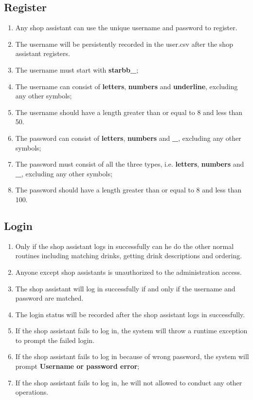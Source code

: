 \documentclass[a4paper]{report}
\begin{document}
\subsection{Register}
\begin{enumerate}
\item Any shop assistant can use the unique username and password to register.
\item The username will be persistently recorded in the user.csv after the shop assistant registers.
\item The username must start with \textbf{starbb\_};
\item The username can consist of \textbf{letters}, \textbf{numbers} and \textbf{underline}, excluding any other symbols;
\item The username should have a length greater than or equal to 8 and less than 50.
\item The password can consist of \textbf{letters}, \textbf{numbers} and \textbf{\_}, excluding any other symbols;
\item The password must consist of all the three types, i.e. \textbf{letters}, \textbf{numbers} and \textbf{\_}, excluding any other symbols;
\item The password should have a length greater than or equal to 8 and less than 100.
\end{enumerate}

\subsection{Login}
\begin{enumerate}
\item Only if the shop assistant logs in successfully can he do the other normal routines including matching drinks, getting drink descriptions and ordering.
\item Anyone except shop assistants is unauthorized to the administration access.
\item The shop assistant will log in successfully if and only if the username and password are matched.
\item The login status will be recorded after the shop assistant logs in successfully.
\item If the shop assistant fails to log in, the system will throw a runtime exception to prompt the failed login.
\item If the shop assistant fails to log in because of wrong password, the system will prompt \textbf{Username or password error};
\item If the shop assistant fails to log in, he will not allowed to conduct any other operations.
\end{enumerate}
\end{document}
